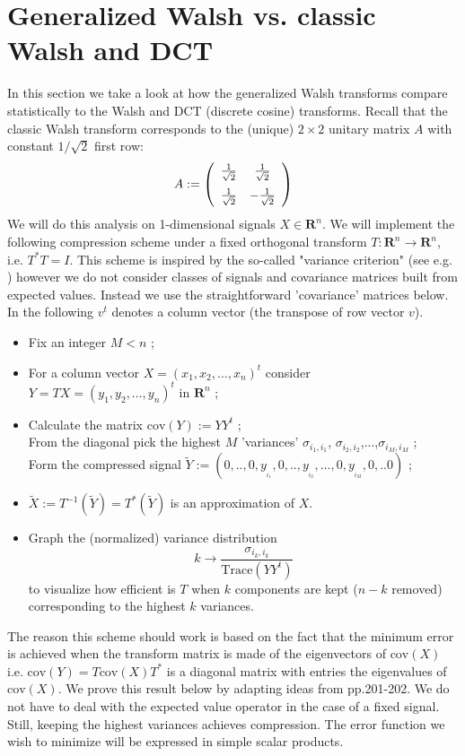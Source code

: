 \documentclass[11pt]{amsart}
\theoremstyle{definition}
\theoremstyle{remark}
\numberwithin{equation}{section}
\begin{document}
\section{Generalized Walsh vs. classic Walsh and DCT}\label{s6}
In this section we take a look at how the generalized Walsh transforms compare statistically to the Walsh and DCT (discrete cosine) transforms. Recall that the classic Walsh transform corresponds to the (unique) $2\times 2$ unitary matrix $A$ with constant $1/\sqrt{2}$ first row:
\begin{equation}\label{2by2}
A:=\left( \begin {array}{cc} \frac{1}{\sqrt{2}}&\frac{1}{\sqrt{2}}
\\ \noalign{\medskip} \frac{1}{\sqrt{2}}& -\frac{1}{\sqrt{2}}\end {array}
 \right)
\end{equation}
We will do this analysis on 1-dimensional signals $X\in\mathbf{R}^n$.
We will implement the following compression scheme  under  a fixed orthogonal transform $T:\mathbf{R}^n\to\mathbf{R}^n$, i.e. $T^{*}T=I$. This scheme is inspired by the so-called "variance criterion" (see e.g. \cite{ AhRa})  however we do not consider classes of  signals and covariance matrices built from expected values. Instead we use the straightforward  'covariance' matrices below. In the following $v^{t}$ denotes a column vector (the transpose of row vector $v$).
\begin{itemize}
\item Fix an integer $M<n$ ;
\item For a column vector $X=(x_1,x_2,\dots,x_n)^t$ consider $Y=TX=(y_1,y_2,\dots,y_n)^t$  in $\mathbf{R}^n$ ;
\item Calculate the matrix $\text{cov}(Y):=YY^t$ ; \\
From the diagonal pick the highest $M$ 'variances' $\sigma_{i_1,i_1}$, $\sigma_{i_2,i_2}$,...,$\sigma_{i_M,i_M}$ ; \\
Form the compressed signal $\tilde{Y}:=(0,..,0,y_{_{i_1}},0,..,y_{_{i_2}},\dots,0, y_{_{i_M}},0,..0)$ ;
\item $\tilde{X}:=T^{-1}(\tilde{Y})=T^*(\tilde{Y})$ is an approximation of $X$.\\
\item Graph the (normalized) variance distribution
$$k\to \frac{\sigma_{i_k, i_k}}{\text{Trace}(YY^t)}$$
to visualize how efficient is $T$ when $k$ components are kept ($n-k$ removed) corresponding to the highest $k$ variances.
\end{itemize}
The reason this scheme should work is  based on the fact that the minimum error is achieved  when the transform matrix is made of the eigenvectors of $\text{cov}(X)$ i.e. $\text{cov}(Y)=T\text{cov}(X)T^*$ is a diagonal matrix with entries the eigenvalues of $\text{cov}(X)$. We prove this result below by adapting ideas from \cite{AhRa} pp.201-202. We do not have to deal with the expected value operator in the case of a fixed signal. Still,  keeping the highest variances achieves compression. The error function we wish to minimize will  be expressed in simple scalar products.
\end{document}
